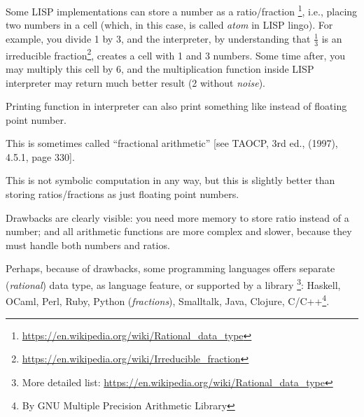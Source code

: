 
Some LISP implementations can store a number as a ratio/fraction
\footnote{\url{https://en.wikipedia.org/wiki/Rational_data_type}}, i.e., placing two numbers in a cell (which, in this case, is called \textit{atom} in LISP lingo).
For example, you divide 1 by 3, and the interpreter, by understanding that $\frac{1}{3}$ is 
an irreducible fraction\footnote{\url{https://en.wikipedia.org/wiki/Irreducible_fraction}}, creates a cell with 1 and 3 numbers.
Some time after, you may multiply this cell by 6, and the multiplication function inside LISP interpreter may return much better result (2 without \textit{noise}).

Printing function in interpreter can also print something like  instead of floating point number.

This is sometimes called ``fractional arithmetic'' [see \ac{TAOCP}, 3rd ed., (1997), 4.5.1, page 330].

This is not symbolic computation in any way, but this is slightly better than storing ratios/fractions as just floating point numbers.

Drawbacks are clearly visible: you need more memory to store ratio instead of a number;
and all arithmetic functions are more complex and slower, because they must handle both numbers and ratios.

Perhaps, because of drawbacks, some programming languages offers separate (\textit{rational}) data type, as language feature, or supported by a library
\footnote{More detailed list: \url{https://en.wikipedia.org/wiki/Rational_data_type}}:
Haskell, OCaml, Perl, Ruby, Python (\textit{fractions}), Smalltalk, Java, Clojure,
C/C++\footnote{By GNU Multiple Precision Arithmetic Library}.

\levelup{}

